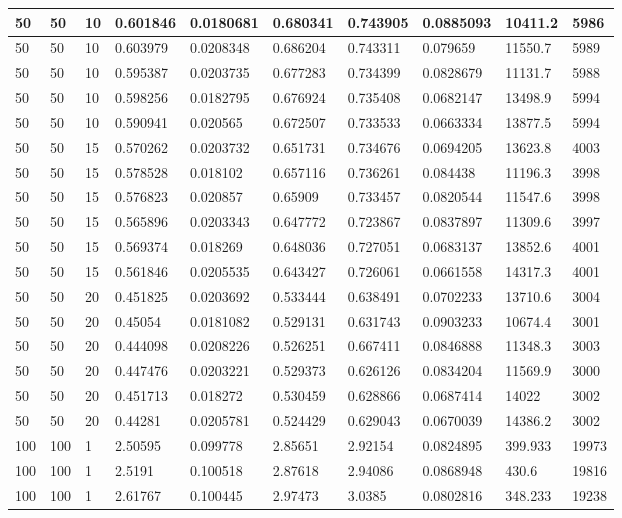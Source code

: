 \begin{landscape}
\begin{longtable}{ | l | l | l | l | l | l | l | l | l | l | }
50 & 50 & 10 & 0.601846 & 0.0180681 & 0.680341 & 0.743905 & 0.0885093 & 10411.2 & 5986\\ \hline
50 & 50 & 10 & 0.603979 & 0.0208348 & 0.686204 & 0.743311 & 0.079659 & 11550.7 & 5989\\ \hline
50 & 50 & 10 & 0.595387 & 0.0203735 & 0.677283 & 0.734399 & 0.0828679 & 11131.7 & 5988\\ \hline
50 & 50 & 10 & 0.598256 & 0.0182795 & 0.676924 & 0.735408 & 0.0682147 & 13498.9 & 5994\\ \hline
50 & 50 & 10 & 0.590941 & 0.020565 & 0.672507 & 0.733533 & 0.0663334 & 13877.5 & 5994\\ \hline
50 & 50 & 15 & 0.570262 & 0.0203732 & 0.651731 & 0.734676 & 0.0694205 & 13623.8 & 4003\\ \hline
50 & 50 & 15 & 0.578528 & 0.018102 & 0.657116 & 0.736261 & 0.084438 & 11196.3 & 3998\\ \hline
50 & 50 & 15 & 0.576823 & 0.020857 & 0.65909 & 0.733457 & 0.0820544 & 11547.6 & 3998\\ \hline
50 & 50 & 15 & 0.565896 & 0.0203343 & 0.647772 & 0.723867 & 0.0837897 & 11309.6 & 3997\\ \hline
50 & 50 & 15 & 0.569374 & 0.018269 & 0.648036 & 0.727051 & 0.0683137 & 13852.6 & 4001\\ \hline
50 & 50 & 15 & 0.561846 & 0.0205535 & 0.643427 & 0.726061 & 0.0661558 & 14317.3 & 4001\\ \hline
50 & 50 & 20 & 0.451825 & 0.0203692 & 0.533444 & 0.638491 & 0.0702233 & 13710.6 & 3004\\ \hline
50 & 50 & 20 & 0.45054 & 0.0181082 & 0.529131 & 0.631743 & 0.0903233 & 10674.4 & 3001\\ \hline
50 & 50 & 20 & 0.444098 & 0.0208226 & 0.526251 & 0.667411 & 0.0846888 & 11348.3 & 3003\\ \hline
50 & 50 & 20 & 0.447476 & 0.0203221 & 0.529373 & 0.626126 & 0.0834204 & 11569.9 & 3000\\ \hline
50 & 50 & 20 & 0.451713 & 0.018272 & 0.530459 & 0.628866 & 0.0687414 & 14022 & 3002\\ \hline
50 & 50 & 20 & 0.44281 & 0.0205781 & 0.524429 & 0.629043 & 0.0670039 & 14386.2 & 3002\\ \hline
100 & 100 & 1 & 2.50595 & 0.099778 & 2.85651 & 2.92154 & 0.0824895 & 399.933 & 19973\\ \hline
100 & 100 & 1 & 2.5191 & 0.100518 & 2.87618 & 2.94086 & 0.0868948 & 430.6 & 19816\\ \hline
100 & 100 & 1 & 2.61767 & 0.100445 & 2.97473 & 3.0385 & 0.0802816 & 348.233 & 19238\\ \hline

\end{longtable}
\end{landscape}

